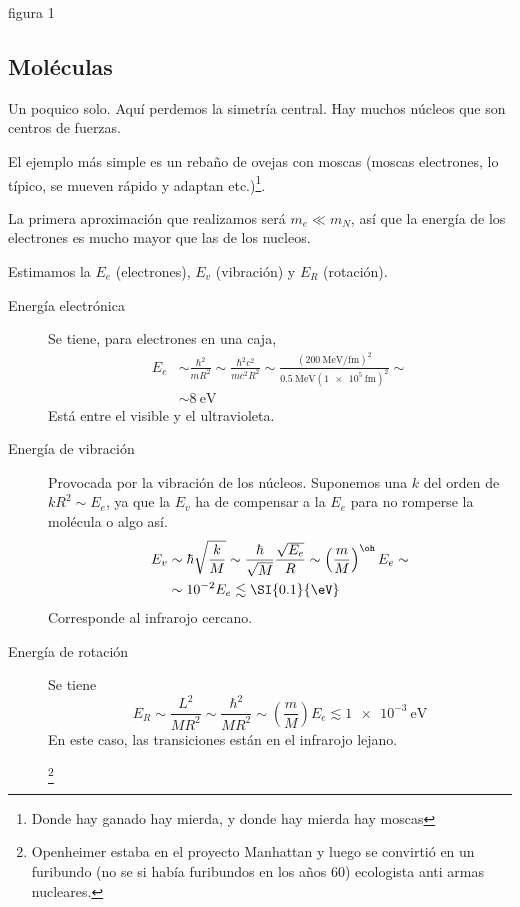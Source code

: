 figura 1

\subsection{Moléculas}
Un poquico solo. Aquí perdemos la simetría central. Hay muchos núcleos
que son centros de fuerzas.

El ejemplo más simple es un rebaño de ovejas con moscas (moscas
electrones, lo típico, se mueven rápido y adaptan etc.)\footnote{Donde hay ganado hay mierda, y donde hay mierda
  hay moscas}.


La primera aproximación que realizamos será $m_e \ll m_N$, así que la
energía de los electrones es mucho mayor que las de los nucleos.

Estimamos la $E_e$ (electrones), $E_v$ (vibración) y $E_R$ (rotación).
\begin{description}
\item[Energía electrónica] Se tiene, para electrones en una caja,
\begin{equation}
  \begin{split}
    E_e &\sim \frac{\hbar^2}{mR^2} \sim \frac{\hbar^2c^2}{mc^2R^2} \sim
    \frac{(\SI{200}{\MeV\per\femto\metre})^2}{\SI{0.5}{\MeV}
      (\SI{1e5}{\femto\metre})^2} \sim \\
    &\sim \SI{8}{\eV}
  \end{split}
\end{equation}
Está entre el visible y el ultravioleta.
\item[Energía de vibración] Provocada por la vibración de los núcleos.
  Suponemos una $k$ del orden de $kR^2 \sim E_e$, ya que la $E_v$ ha
  de compensar a la $E_e$ para no romperse la molécula o algo así.
\begin{equation}
  \begin{split}
    E_v &\sim \hbar \sqrt{\frac{k}{M}} \sim \frac{\hbar}{\sqrt{M}}
    \frac{\sqrt{E_e}}{R} \sim \left( \frac{m}{M} \right)^{\oh} E_e
    \sim \\
    &\sim 10^{-2}E_e \lesssim \SI{0.1}{\eV}
  \end{split}
\end{equation}
Corresponde al infrarojo cercano.
\item[Energía de rotación] Se tiene
\begin{equation}
  E_R \sim \frac{L^2}{MR^2} \sim \frac{\hbar^2}{MR^2} \sim \left(
    \frac{m}{M} \right)E_e \lesssim \SI{1e-3}{\eV}
\end{equation}
En este caso, las transiciones están en el infrarojo lejano. 

\footnote{Openheimer estaba en el proyecto Manhattan y luego se
  convirtió en un furibundo (no se si había furibundos en los años 60)
  ecologista anti armas nucleares.}
\end{description}


